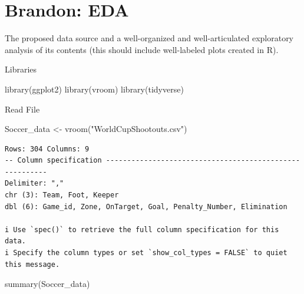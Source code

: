 \documentclass[
  letterpaper,
  DIV=11,
  numbers=noendperiod]{scrartcl}
\newenvironment{Shaded}{\begin{snugshade}}{\end{snugshade}}
\newcommand{\FunctionTok}[1]{\textcolor[rgb]{0.28,0.35,0.67}{#1}}
\newcommand{\NormalTok}[1]{\textcolor[rgb]{0.00,0.23,0.31}{#1}}
\newcommand{\OtherTok}[1]{\textcolor[rgb]{0.00,0.23,0.31}{#1}}
\newcommand{\StringTok}[1]{\textcolor[rgb]{0.13,0.47,0.30}{#1}}
\begin{document}
\section{Brandon: EDA}\label{brandon-eda}

The proposed data source and a well-organized and well-articulated
exploratory analysis of its contents (this should include well-labeled
plots created in R).

Libraries

\begin{Shaded}
\begin{Highlighting}[]
\FunctionTok{library}\NormalTok{(ggplot2)}
\FunctionTok{library}\NormalTok{(vroom)}
\FunctionTok{library}\NormalTok{(tidyverse)}
\end{Highlighting}
\end{Shaded}

Read File

\begin{Shaded}
\begin{Highlighting}[]
\NormalTok{Soccer\_data }\OtherTok{\textless{}{-}} \FunctionTok{vroom}\NormalTok{(}\StringTok{"WorldCupShootouts.csv"}\NormalTok{)}
\end{Highlighting}
\end{Shaded}

\begin{verbatim}
Rows: 304 Columns: 9
-- Column specification --------------------------------------------------------
Delimiter: ","
chr (3): Team, Foot, Keeper
dbl (6): Game_id, Zone, OnTarget, Goal, Penalty_Number, Elimination

i Use `spec()` to retrieve the full column specification for this data.
i Specify the column types or set `show_col_types = FALSE` to quiet this message.
\end{verbatim}

\begin{Shaded}
\begin{Highlighting}[]
\FunctionTok{summary}\NormalTok{(Soccer\_data)}
\end{Highlighting}
\end{Shaded}
\end{document}
